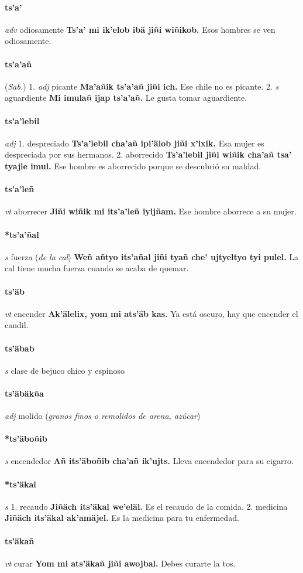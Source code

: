 \documentclass{scrbook}
\newcommand{\entry}[1]{\paragraph{#1}}
\newcommand{\onedefinition}[1]{#1.}
\newcommand{\partofspeech}[1]{\textit{#1}}
\newcommand{\spanishtranslation}[1]{#1}
\newcommand{\clarification}[1]{(\textit{#1})}
\newcommand{\cholexample}[1]{\textbf{#1}}
\newcommand{\exampletranslation}[1]{#1}
\newcommand{\relevantdialect}[1]{(\textit{#1})}
\begin{document}
\begin{multicols}{2}
\entry{ts'a'}
\partofspeech{adv}
\spanishtranslation{odiosamente}
\cholexample{Ts'a' mi ik'elob ibä jiñi wiñikob.}
\exampletranslation{Esos hombres se ven odiosamente.}

\entry{ts'a'añ}
\relevantdialect{Sab.}
\onedefinition{1}
\partofspeech{adj}
\spanishtranslation{picante}
\cholexample{Ma'añik ts'a'añ jiñi ich.}
\exampletranslation{Ese chile no es picante.}
\onedefinition{2}
\partofspeech{s}
\spanishtranslation{aguardiente}
\cholexample{Mi imulañ ijap ts'a'añ.}
\exampletranslation{Le gusta tomar aguardiente.}

\entry{ts'a'lebil}
\partofspeech{adj}
\onedefinition{1}
\spanishtranslation{despreciado}
\cholexample{Ts'a'lebil cha'añ ipi'älob jiñi x'ixik.}
\exampletranslation{Esa mujer es despreciada por sus hermanos.}
\onedefinition{2}
\spanishtranslation{aborrecido}
\cholexample{Ts'a'lebil jiñi wiñik cha'añ tsa' tyajle imul.}
\exampletranslation{Ese hombre es aborrecido porque se descubrió su maldad.}

\entry{ts'a'leñ}
\partofspeech{vt}
\spanishtranslation{aborrecer}
\cholexample{Jiñi wiñik mi its'a'leñ iyijñam.}
\exampletranslation{Ese hombre aborrece a su mujer.}

\entry{*ts'a'ñal}
\partofspeech{s}
\spanishtranslation{fuerza}
\clarification{de la cal}
\cholexample{Weñ añtyo its'añal jiñi tyañ che' ujtyeltyo tyi pulel.}
\exampletranslation{La cal tiene mucha fuerza cuando se acaba de quemar.}

\entry{ts'äb}
\partofspeech{vt}
\spanishtranslation{encender}
\cholexample{Ak'älelix, yom mi ats'äb kas.}
\exampletranslation{Ya está oscuro, hay que encender el candil.}

\entry{ts'äbab}
\partofspeech{s}
\spanishtranslation{clase de bejuco chico y espinoso}

\entry{ts'äbäkña}
\partofspeech{adj}
\spanishtranslation{molido}
\clarification{granos finos o remolidos de arena, azúcar}

\entry{*ts'äboñib}
\partofspeech{s}
\spanishtranslation{encendedor}
\cholexample{Añ its'äboñib cha'añ ik'ujts.}
\exampletranslation{Lleva encendedor para su cigarro.}

\entry{*ts'äkal}
\partofspeech{s}
\onedefinition{1}
\spanishtranslation{recaudo}
\cholexample{Jiñäch its'äkal we'eläl.}
\exampletranslation{Es el recaudo de la comida.}
\onedefinition{2}
\spanishtranslation{medicina}
\cholexample{Jiñäch its'äkal ak'amäjel.}
\exampletranslation{Es la medicina para tu enfermedad.}

\entry{ts'äkañ}
\partofspeech{vt}
\spanishtranslation{curar}
\cholexample{Yom mi ats'äkañ jiñi awojbal.}
\exampletranslation{Debes curarte la tos.}


\end{multicols}
\end{document}
